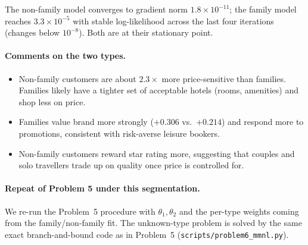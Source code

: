 \documentclass[11pt]{article}
\begin{document}
The non-family model converges to gradient norm
$1.8\!\times\!10^{-11}$; the family model reaches $3.3\!\times\!10^{-5}$
with stable log-likelihood across the last four iterations
(changes below $10^{-8}$). Both are at their stationary point.

\paragraph{Comments on the two types.}
\begin{itemize}
  \item Non-family customers are about $2.3\times$ more price-sensitive
    than families. Families likely have a tighter set of acceptable hotels
    (rooms, amenities) and shop less on price.
  \item Families value brand more strongly ($+0.306$ vs.\ $+0.214$) and
    respond more to promotions, consistent with risk-averse leisure
    bookers.
  \item Non-family customers reward star rating more, suggesting that
    couples and solo travellers trade up on quality once price is
    controlled for.
\end{itemize}

\paragraph{Repeat of Problem 5 under this segmentation.}
We re-run the Problem~5 procedure with $\theta_1, \theta_2$ and the
per-type weights coming from the family/non-family fit. The unknown-type
problem is solved by the same exact branch-and-bound code as in Problem~5
(\texttt{scripts/problem6\_mmnl.py}).
\end{document}
